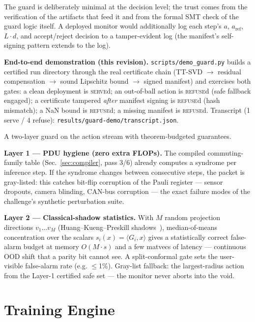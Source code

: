 \documentclass[conference,10pt]{IEEEtran}
\begin{document}
The guard is deliberately minimal at the decision level; the trust comes from the
verification of the artifacts that feed it and from the formal SMT check of the
guard logic itself. A deployed monitor would additionally log each step's
$a$, $a_{\text{ref}}$, $L{\cdot}d$, and accept/reject decision to a tamper-evident
log (the manifest's self-signing pattern extends to the log).

\textbf{End-to-end demonstration (this revision).} \texttt{scripts/demo\_guard.py}
builds a certified run directory through the real certificate chain (TT-SVD
$\to$ residual compensation $\to$ sound Lipschitz bound $\to$ signed manifest)
and exercises both gates: a clean deployment is \textsc{serve}d; an
out-of-ball action is \textsc{refuse}d (safe fallback engaged); a certificate
tampered \emph{after} manifest signing is \textsc{refuse}d (hash mismatch);
a NaN bound is \textsc{refuse}d; a missing manifest is \textsc{refuse}d.
Transcript (1 serve / 4 refuse): \texttt{results/guard-demo/transcript.json}.


\label{sec:monitor}

A two-layer guard on the action stream with theorem-budgeted guarantees.

\textbf{Layer 1 --- PDU hygiene (zero extra FLOPs).} The compiled commuting-family
table (Sec.~\ref{sec:compiler}, pass 3/6) already computes a syndrome per
inference step. If the syndrome changes between consecutive steps, the packet is
gray-listed: this catches bit-flip corruption of the Pauli register --- sensor
dropouts, camera blinding, CAN-bus corruption --- the exact failure modes of the
challenge's synthetic perturbation suite.

\textbf{Layer 2 --- Classical-shadow statistics.} With $M$ random projection
directions $v_1\dots v_M$ (Huang--Kueng--Preskill shadows~\cite{shadows}),
median-of-means concentration over the scalars $s_i(x)=\langle G_i, x\rangle$
gives a statistically correct false-alarm budget at memory $O(M\cdot s)$ and a
few matvecs of latency --- continuous OOD shift that a parity bit cannot see.
A split-conformal gate sets the user-visible false-alarm rate (e.g. $\le$1\%).
Gray-list fallback: the largest-radius action from the Layer-1 certified safe
set --- the monitor never aborts into the void.

\section{Training Engine}
\label{sec:engine}
\end{document}

